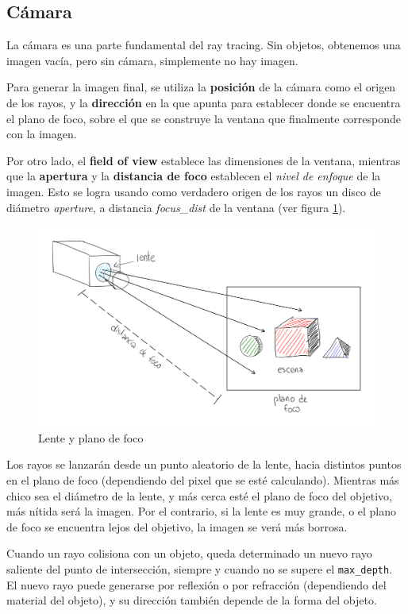 \subsection{Cámara} \label{ssec:rt-camera}

La cámara es una parte fundamental del ray tracing. Sin objetos, obtenemos una
imagen vacía, pero sin cámara, simplemente no hay imagen.

Para generar la imagen final, se utiliza la \textbf{posición} de la cámara como
el origen de los rayos, y la \textbf{dirección} en la que apunta para establecer
donde se encuentra el plano de foco, sobre el que se construye la ventana que
finalmente corresponde con la imagen.

Por otro lado, el \textbf{field of view} establece las dimensiones de la
ventana, mientras que la \textbf{apertura} y la \textbf{distancia de foco}
establecen el \textit{nivel de enfoque} de la imagen. Esto se logra usando como
verdadero origen de los rayos un disco de diámetro \textit{aperture}, a
distancia \textit{focus\_dist} de la ventana (ver figura
\ref{fig:rt-camera-plano-foco}).

\begin{figure}[H]
  \centering
  \includegraphics[width=.7\textwidth]{imgs/rt-camera-rays-through-lens.png}
  \caption{Lente y plano de foco}
  \label{fig:rt-camera-plano-foco}
\end{figure}

Los rayos se lanzarán desde un punto aleatorio de la lente, hacia distintos
puntos en el plano de foco (dependiendo del pixel que se esté calculando).
Mientras más chico sea el diámetro de la lente, y más cerca esté el plano de
foco del objetivo, más nítida será la imagen. Por el contrario, si la lente es
muy grande, o el plano de foco se encuentra lejos del objetivo, la imagen se
verá más borrosa.

Cuando un rayo colisiona con un objeto, queda determinado un nuevo rayo saliente
del punto de intersección, siempre y cuando no se supere el \texttt{max\_depth}.
El nuevo rayo puede generarse por reflexión o por refracción (dependiendo del
material del objeto), y su dirección también depende de la forma del objeto.

